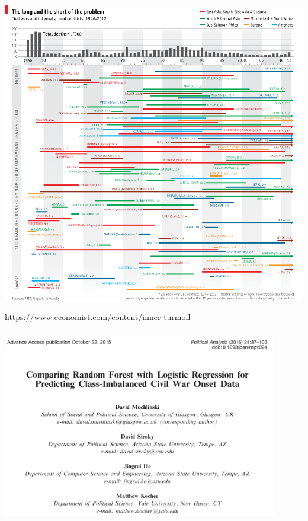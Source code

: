 \documentclass[aspectratio=169]{beamer}
\begin{document}
\begin{frame}
\frametitle{}

\begin{center}
\includegraphics[height=0.9\textheight]{figures/ourworldindata_the-100-deadlist-civil-wars-the-economist}
\end{center}

\vfill
\tiny{\url{https://www.economist.com/content/inner-turmoil}}
\end{frame}
\begin{frame}
\frametitle{}

\begin{center}
\includegraphics[width=0.9\textwidth]{figures/muchlinksi_comparing_2016_title}
\end{center}

\end{frame}
\end{document}
